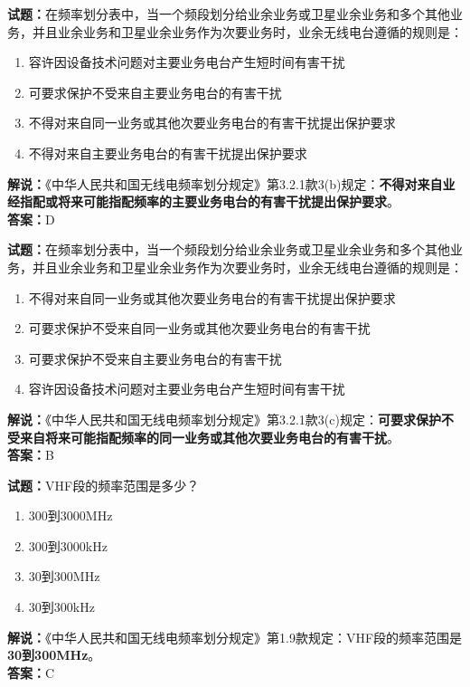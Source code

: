 \documentclass{ctexbook}
\begin{document}
\bigskip


\noindent\textbf{试题：}在频率划分表中，当一个频段划分给业余业务或卫星业余业务和多个其他业务，并且业余业务和卫星业余业务作为次要业务时，业余无线电台遵循的规则是：
\begin{enumerate}[leftmargin=3em]
	\item 容许因设备技术问题对主要业务电台产生短时间有害干扰
	\item 可要求保护不受来自主要业务电台的有害干扰
	\item 不得对来自同一业务或其他次要业务电台的有害干扰提出保护要求
	\item 不得对来自主要业务电台的有害干扰提出保护要求
\end{enumerate}
\noindent\textbf{解说：}《中华人民共和国无线电频率划分规定》第3.2.1款3(b)规定：\textbf{不得对来自业经指配或将来可能指配频率的主要业务电台的有害干扰提出保护要求}。\\\textbf{答案：}D




\bigskip


\noindent\textbf{试题：}在频率划分表中，当一个频段划分给业余业务或卫星业余业务和多个其他业务，并且业余业务和卫星业余业务作为次要业务时，业余无线电台遵循的规则是：
\begin{enumerate}[leftmargin=3em]
	\item 不得对来自同一业务或其他次要业务电台的有害干扰提出保护要求
	\item 可要求保护不受来自同一业务或其他次要业务电台的有害干扰
	\item 可要求保护不受来自主要业务电台的有害干扰
	\item 容许因设备技术问题对主要业务电台产生短时间有害干扰
\end{enumerate}
\noindent\textbf{解说：}《中华人民共和国无线电频率划分规定》第3.2.1款3(c)规定：\textbf{可要求保护不受来自将来可能指配频率的同一业务或其他次要业务电台的有害干扰}。\\
\textbf{答案：}B




\bigskip


\noindent\textbf{试题：}VHF段的频率范围是多少？
\begin{enumerate}[leftmargin=3em]
	\item 300到3000\si{\MHz}
	\item 300到3000\si{\kHz}
	\item 30到300\si{\MHz}
	\item 30到300\si{\kHz}
\end{enumerate}
\noindent\textbf{解说：}《中华人民共和国无线电频率划分规定》第1.9款规定：VHF段的频率范围是\textbf{30到300\si{\MHz}}。\\\noindent\textbf{答案：}C
\end{document}
